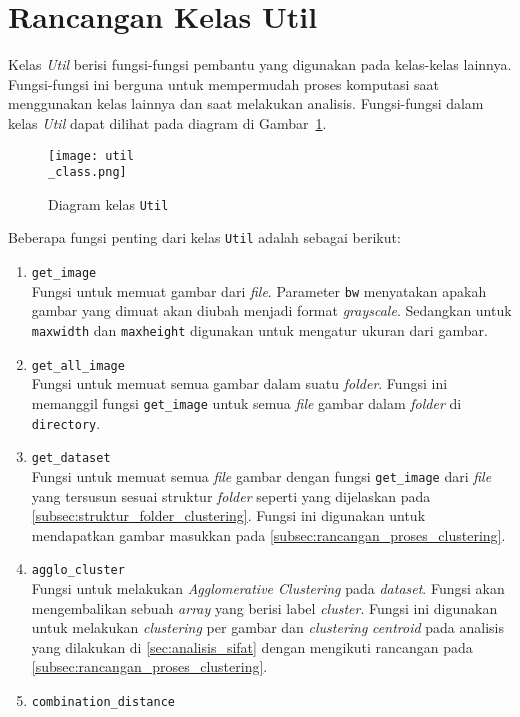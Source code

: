 \section{Rancangan Kelas Util}
Kelas \textit{Util} berisi fungsi-fungsi pembantu yang digunakan pada kelas-kelas lainnya. Fungsi-fungsi ini berguna untuk mempermudah proses komputasi saat menggunakan kelas lainnya dan saat melakukan analisis. Fungsi-fungsi dalam kelas \textit{Util} dapat dilihat pada diagram di Gambar~\ref{fig:util_class}.
\begin{figure}[H]
	\centering
	\texttt{[image: util\\\_class.png]}
	\caption{Diagram kelas \texttt{Util}}
	\label{fig:util_class}
\end{figure}
Beberapa fungsi penting dari kelas \texttt{Util} adalah sebagai berikut:
\begin{enumerate}
	\item \texttt{get\_image} \\
	Fungsi untuk memuat gambar dari \textit{file}. Parameter \texttt{bw} menyatakan apakah gambar yang dimuat akan diubah menjadi format \textit{grayscale}. Sedangkan untuk \texttt{maxwidth} dan \texttt{maxheight} digunakan untuk mengatur ukuran dari gambar.
	\item \texttt{get\_all\_image} \\
	Fungsi untuk memuat semua gambar dalam suatu \textit{folder}. Fungsi ini memanggil fungsi \texttt{get\_image} untuk semua \textit{file} gambar dalam \textit{folder} di \texttt{directory}.
	\item \texttt{get\_dataset} \\
	Fungsi untuk memuat semua \textit{file} gambar dengan fungsi \texttt{get\_image} dari \textit{file} yang tersusun sesuai struktur \textit{folder} seperti yang dijelaskan pada \ref{subsec:struktur_folder_clustering}. Fungsi ini digunakan untuk mendapatkan gambar masukkan pada \ref{subsec:rancangan_proses_clustering}.
	\item \texttt{agglo\_cluster} \\
	Fungsi untuk melakukan \textit{Agglomerative Clustering} pada \textit{dataset}. Fungsi akan mengembalikan sebuah \textit{array} yang berisi label \textit{cluster}. Fungsi ini digunakan untuk melakukan \textit{clustering} per gambar dan \textit{clustering} \textit{centroid} pada analisis yang dilakukan di \ref{sec:analisis_sifat} dengan mengikuti rancangan pada \ref{subsec:rancangan_proses_clustering}.
	\item \texttt{combination\_distance} \\

\end{enumerate}
